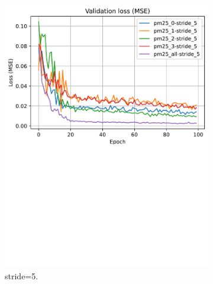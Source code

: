 \begin{figure}[!htbp]
\begin{subfigure}[!htbp]{.45\textwidth}
        \includegraphics[width=\textwidth]{fig/results/val_curves_stride_5.pdf}
        \caption{stride=5.}
        \label{fig:val_stride_5}
    \end{subfigure}
    \begin{subfigure}[!htbp]{.45\textwidth}
        \centering

\end{subfigure}
\end{figure}
